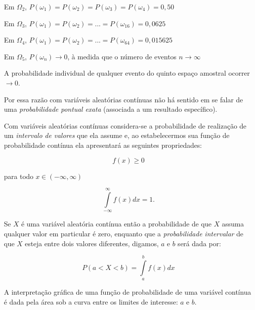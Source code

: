 \documentclass[
]{book}
\begin{document}
\hfill\break

Em \(\Omega_{2}\), \(P(\omega_{1})=P(\omega_{2})=P(\omega_{3})=P(\omega_{4})=0,50\)

\hfill\break

Em \(\Omega_{3}\), \(P(\omega_{1})=P(\omega_{2})=...=P(\omega_{16})=0,0625\)

\hfill\break

Em \(\Omega_{4}\), \(P(\omega_{1})=P(\omega_{2})=...=P(\omega_{64})=0,015625\)

\hfill\break

Em \(\Omega_{5}\), \(P(\omega_{n}) \rightarrow 0\), à medida que o número de eventos \(n \rightarrow \infty\)

\hfill\break

A probabilidade individual de qualquer evento do quinto espaço amostral ocorrer \(\rightarrow 0\).

Por essa razão com variáveis aleatórias contínuas não há sentido em se falar de uma \emph{probabilidade pontual exata} (associada a um resultado específico).

\hfill\break

Com variáveis aleatórias contínuas considera-se a probabilidade de realização de um \emph{intervalo de valores} que ela assume e, ao estabelecermos sua função de probabilidade contínua ela apresentará as seguintes propriedades:

\hfill\break

\[
f(x) \geq 0
\]

para todo \(x \in (-\infty, \infty)\)

\[
\underset{-\infty }{\overset{\infty }{\int }}f\left(x\right)dx = 1.
\]

\hfill\break

Se \(X\) é uma variável aleatória contínua então a probabilidade de que \(X\) assuma qualquer valor em particular é zero, enquanto que a \emph{probabilidade intervalar} de que \(X\) esteja entre dois valores diferentes, digamos, \(a\) e \(b\) será dada por:

\hfill\break

\[
P(a < X < b) = \underset{a}{\overset{b}{\int }}f\left(x\right)dx
\]

\hfill\break

A interpretação gráfica de uma função de probabilidade de uma variável contínua é dada pela área sob a curva entre os limites de interesse: \(a\) e \(b\).

\hfill\break
\end{document}
